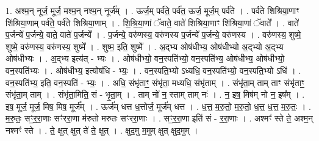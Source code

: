 \documentclass[17pt]{extarticle}
\begin{document}
1. अश्म॒न् नूर्ज॒ मूर्ज॒ मश्म॒न् नश्म॒न् नूर्ज᳚म् । . ऊर्ज॒म् पर्व॑ते॒ पर्व॑त॒ ऊर्ज॒ मूर्ज॒म् पर्व॑ते । . पर्व॑ते शिश्रिया॒णाꣳ शि॑श्रिया॒णाम् पर्व॑ते॒ पर्व॑ते शिश्रिया॒णाम् । . शि॒श्रि॒या॒णां ॅवाते॒ वाते॑ शिश्रिया॒णाꣳ शि॑श्रिया॒णां ॅवाते᳚ । . वाते॑ प॒र्जन्ये॑ प॒र्जन्ये॒ वाते॒ वाते॑ प॒र्जन्ये᳚ । . प॒र्जन्ये॒ वरु॑णस्य॒ वरु॑णस्य प॒र्जन्ये॑ प॒र्जन्ये॒ वरु॑णस्य । . वरु॑णस्य॒ शुष्मे॒ शुष्मे॒ वरु॑णस्य॒ वरु॑णस्य॒ शुष्मे᳚ । . शुष्म॒ इति॒ शुष्मे᳚ । . अ॒द्भ्य ओष॑धीभ्य॒ ओष॑धीभ्यो अ॒द्भ्यो अ॒द्भ्य ओष॑धीभ्यः । . अ॒द्भ्य इत्य॑त् - भ्यः । . ओष॑धीभ्यो॒ वन॒स्पति॑भ्यो॒ वन॒स्पति॑भ्य॒ ओष॑धीभ्य॒ ओष॑धीभ्यो॒ वन॒स्पति॑भ्यः । . ओष॑धीभ्य॒ इत्योष॑धि - भ्यः॒ । . वन॒स्पति॒भ्यो ऽध्यधि॒ वन॒स्पति॑भ्यो॒ वन॒स्पति॒भ्यो ऽधि॑ । . वन॒स्पति॑भ्य॒ इति॒ वन॒स्पति॑ - भ्यः॒ । . अधि॒ संभृ॑ताꣳ॒॒ संभृ॑ता॒ मध्यधि॒ संभृ॑ताम् । . संभृ॑ता॒म् ताम् ताꣳ संभृ॑ताꣳ॒॒ संभृ॑ता॒म् ताम् । . संभृ॑ता॒मिति॒ सं - भृ॒ता॒म् । . ताम् नो॑ न॒ स्ताम् ताम् नः॑ । . न॒ इष॒ मिष॑म् नो न॒ इष᳚म् । . इष॒ मूर्ज॒ मूर्ज॒ मिष॒ मिष॒ मूर्ज᳚म् । . ऊर्ज॑म् धत्त ध॒त्तोर्ज॒ मूर्ज॑म् धत्त । . ध॒त्त॒ म॒रु॒तो॒ म॒रु॒तो॒ ध॒त्त॒ ध॒त्त॒ म॒रु॒तः॒ । . म॒रु॒तः॒ सꣳ॒॒र॒रा॒णाः सꣳ॑ररा॒णा म॑रुतो मरुतः सꣳररा॒णाः । . सꣳ॒॒र॒रा॒णा इति॑ सं - र॒रा॒णाः । . अश्मꣳ॑ स्ते ते॒ अश्म॒न् नश्मꣳ॑ स्ते । . ते॒ क्षुत् क्षुत् ते॑ ते॒ क्षुत् । . क्षुद॒मु म॒मुम् क्षुत् क्षुद॒मुम् । \newline
\end{document}
